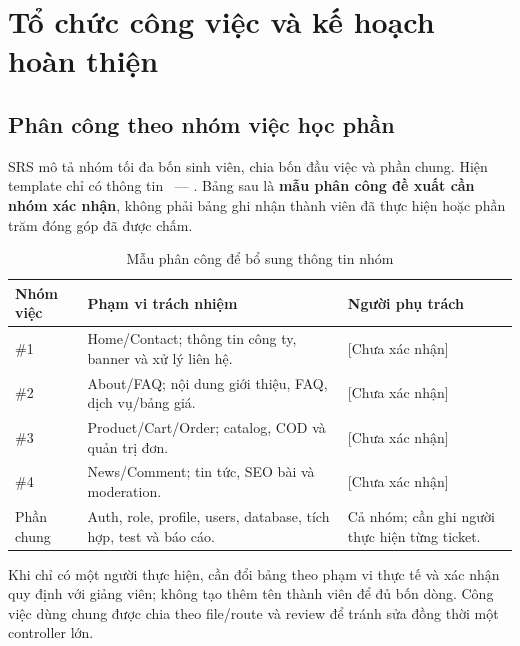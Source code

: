 \section{Tổ chức công việc và kế hoạch hoàn thiện}
\label{sec:management}
\subsection{Phân công theo nhóm việc học phần}
SRS mô tả nhóm tối đa bốn sinh viên, chia bốn đầu việc và phần chung. Hiện template chỉ có thông tin \ReportAuthor\ — \ReportStudentID. Bảng sau là \textbf{mẫu phân công đề xuất cần nhóm xác nhận}, không phải bảng ghi nhận thành viên đã thực hiện hoặc phần trăm đóng góp đã được chấm.
\begin{table}[H]\centering
\caption{Mẫu phân công để bổ sung thông tin nhóm}\label{tab:team}
\begin{tabularx}{\linewidth}{@{}P{1.8cm}YP{4.1cm}@{}}\toprule
Nhóm việc & Phạm vi trách nhiệm & Người phụ trách\\\midrule
\#1 & Home/Contact; thông tin công ty, banner và xử lý liên hệ. & [Chưa xác nhận]\\
\#2 & About/FAQ; nội dung giới thiệu, FAQ, dịch vụ/bảng giá. & [Chưa xác nhận]\\
\#3 & Product/Cart/Order; catalog, COD và quản trị đơn. & [Chưa xác nhận]\\
\#4 & News/Comment; tin tức, SEO bài và moderation. & [Chưa xác nhận]\\
Phần chung & Auth, role, profile, users, database, tích hợp, test và báo cáo. & Cả nhóm; cần ghi người thực hiện từng ticket.\\
\bottomrule\end{tabularx}
\end{table}
Khi chỉ có một người thực hiện, cần đổi bảng theo phạm vi thực tế và xác nhận quy định với giảng viên; không tạo thêm tên thành viên để đủ bốn dòng. Công việc dùng chung được chia theo file/route và review để tránh sửa đồng thời một controller lớn.

